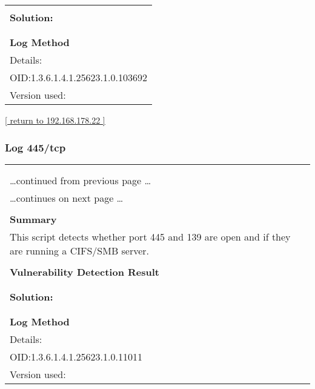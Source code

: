 \documentclass{article}
\begin{document}
\begin{longtable}{|p{}|}
          \hline
          \\
\textbf{Solution:}\\
\\


        \hline
        \\
\textbf{Log Method}\\
Details:
\rowcolor{white}{\verb=SSL/TLS: Collect and Report Certificate Details=}\\
OID:1.3.6.1.4.1.25623.1.0.103692\\
Version used:
\rowcolor{white}{\verb=2021-12-10T12:48:00Z=}\\
\end{longtable}

\begin{footnotesize}\hyperref[host:192.168.178.22]{[ return to 192.168.178.22 ]}\end{footnotesize}
\subsubsection{Log 445/tcp}
\label{port:192.168.178.22 445/tcp Log}

\begin{longtable}{|p{}|}
\hline
\rowcolor{gvm_log}{\color{white}{Log (CVSS: 0.0) }}\\
\rowcolor{gvm_log}{\color{white}{NVT: SMB/CIFS Server Detection}}\\
\hline
\endfirsthead
\hfill\ldots continued from previous page \ldots \\
\hline
\endhead
\hline
\ldots continues on next page \ldots \\
\endfoot
\hline
\endlastfoot
\\
\textbf{Summary}\\
This script detects whether port 445 and 139 are open and
  if they are running a CIFS/SMB server.\\

        \hline
        \\
\textbf{Vulnerability Detection Result}\\
\rowcolor{white}{\verb=A CIFS server is running on this port=}\\

          \hline
          \\
\textbf{Solution:}\\
\\


        \hline
        \\
\textbf{Log Method}\\
Details:
\rowcolor{white}{\verb=SMB/CIFS Server Detection=}\\
OID:1.3.6.1.4.1.25623.1.0.11011\\
Version used:
\rowcolor{white}{\verb=2020-11-10T15:30:28Z=}\\
\end{longtable}
\end{document}
